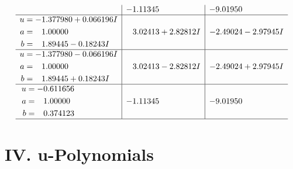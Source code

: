 \documentclass[1p]{elsarticle_modified}
\theoremstyle{definition}
\begin{document}
$$\begin{array}{c|c|c}
 & -1.11345\phantom{ +0.000000I} & -9.01950\phantom{ +0.000000I} \\ \hline\begin{aligned}
u &= -1.377980 + 0.066196 I \\
a &= \phantom{-}1.00000\phantom{ +0.000000I} \\
b &= \phantom{-}1.89445 - 0.18243 I\end{aligned}
 & \phantom{-}3.02413 + 2.82812 I & -2.49024 - 2.97945 I \\ \hline\begin{aligned}
u &= -1.377980 - 0.066196 I \\
a &= \phantom{-}1.00000\phantom{ +0.000000I} \\
b &= \phantom{-}1.89445 + 0.18243 I\end{aligned}
 & \phantom{-}3.02413 - 2.82812 I & -2.49024 + 2.97945 I \\ \hline\begin{aligned}
u &= -0.611656\phantom{ +0.000000I} \\
a &= \phantom{-}1.00000\phantom{ +0.000000I} \\
b &= \phantom{-}0.374123\phantom{ +0.000000I}\end{aligned}
 & -1.11345\phantom{ +0.000000I} & -9.01950\phantom{ +0.000000I}\\
 \hline 
 \end{array}$$\newpage
\newpage\renewcommand{\arraystretch}{1}
\centering \section*{ IV. u-Polynomials}
\end{document}
